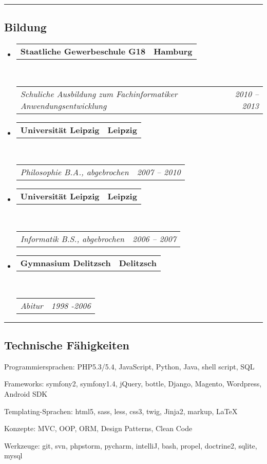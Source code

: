 \documentclass[11pt,a4paper]{article}
\makeatletter
\newenvironment{indentsection}[1]%
{\begin{list}{}%
	{\setlength{\leftmargin}{#1}}%
	\item[]%
}
{\end{list}}
\newcommand{\headerrow}[2]
{\begin{tabular*}{\linewidth}{l@{\extracolsep{\fill}}r}
	#1 &
	#2 \\
\end{tabular*}}
\makeatother
\begin{document}
\hrule
\vspace{-0.4em}
\subsection*{Bildung}

\begin{itemize}
	\parskip=0.1em
	
	\item 
	\headerrow
	{\textbf{Staatliche Gewerbeschule G18}}
	{\textbf{Hamburg}}
	\\
	\headerrow
	{\emph{Schuliche Ausbildung zum Fachinformatiker Anwendungsentwicklung}}
	{\emph{2010 -- 2013}}
		
		  
	\item 
	\headerrow
	{\textbf{Universität Leipzig}}
	{\textbf{Leipzig}}
	\\
	\headerrow
	{\emph{Philosophie B.A., abgebrochen}}
	{\emph{2007 -- 2010}}
	
	\item 
	\headerrow
	{\textbf{Universität Leipzig}}
	{\textbf{Leipzig}}
	\\
	\headerrow
	{\emph{Informatik B.S., abgebrochen}}
	{\emph{2006 -- 2007}}
	
  \item 
	\headerrow
	{\textbf{Gymnasium Delitzsch}}
	{\textbf{Delitzsch}}
	\\
	\headerrow
	{\emph{Abitur}}
	{\emph{1998 -2006}}
	
\end{itemize}

\hrule
\vspace{-0.4em}
\subsection*{Technische Fähigkeiten}

\begin{indentsection}{\parindent}
	\begin{description*}
		\item[Programmiersprachen:]
		PHP5.3/5.4, JavaScript, Python, Java, shell script, SQL
		\item[Frameworks:]
		symfony2, symfony1.4, jQuery, bottle, Django, Magento, Wordpress, Android SDK
		\item[Templating-Sprachen:]
		html5, sass, less, css3, twig, Jinja2, markup, \LaTeX
		\item[Konzepte:]
		MVC, OOP, ORM, Design Patterns, Clean Code
		\item[Werkzeuge:]
		git, svn, phpstorm, pycharm, intelliJ, bash, propel, doctrine2, sqlite, mysql
	\end{description*}
\end{indentsection}
\end{document}
